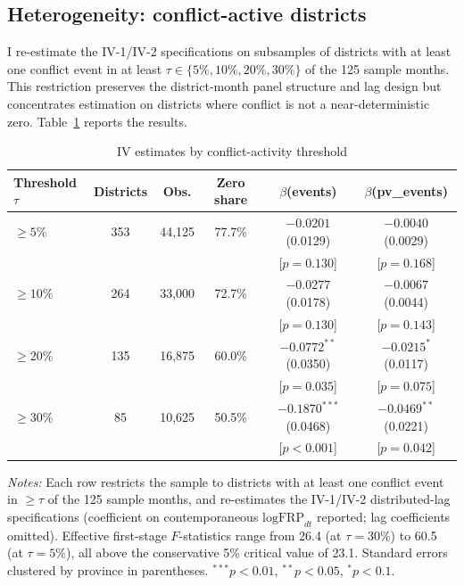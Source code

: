 \documentclass[12pt]{article}
\begin{document}
\subsection{Heterogeneity: conflict-active districts}
\label{sec:active}

I re-estimate the IV-1/IV-2 specifications on subsamples of districts with at least one conflict event in at least $\tau \in \{5\%, 10\%, 20\%, 30\%\}$ of the 125 sample months. This restriction preserves the district-month panel structure and lag design but concentrates estimation on districts where conflict is not a near-deterministic zero. Table~\ref{tab:active} reports the results.

\begin{table}[H]
\centering
\caption{IV estimates by conflict-activity threshold}
\label{tab:active}
\begin{tabular}{lccccc}
\toprule
Threshold $\tau$ & Districts & Obs. & Zero share & $\beta$(events) & $\beta$(pv\_events) \\
\midrule
$\geq 5\%$  & 353 & 44{,}125 & 77.7\% & $-0.0201$ (0.0129) & $-0.0040$ (0.0029) \\
            &     &          &        & [$p=0.130$] & [$p=0.168$] \\
$\geq 10\%$ & 264 & 33{,}000 & 72.7\% & $-0.0277$ (0.0178) & $-0.0067$ (0.0044) \\
            &     &          &        & [$p=0.130$] & [$p=0.143$] \\
$\geq 20\%$ & 135 & 16{,}875 & 60.0\% & $-0.0772^{**}$ (0.0350) & $-0.0215^{*}$ (0.0117) \\
            &     &          &        & [$p=0.035$] & [$p=0.075$] \\
$\geq 30\%$ & 85  & 10{,}625 & 50.5\% & $-0.1870^{***}$ (0.0468) & $-0.0469^{**}$ (0.0221) \\
            &     &          &        & [$p<0.001$] & [$p=0.042$] \\
\bottomrule
\end{tabular}
\begin{minipage}{0.95\textwidth}
\vspace{4pt}
\footnotesize \emph{Notes:} Each row restricts the sample to districts with at least one conflict event in $\geq \tau$ of the 125 sample months, and re-estimates the IV-1/IV-2 distributed-lag specifications (coefficient on contemporaneous $\text{logFRP}_{dt}$ reported; lag coefficients omitted). Effective first-stage $F$-statistics \citep{montielolea2013} range from 26.4 (at $\tau=30\%$) to 60.5 (at $\tau=5\%$), all above the conservative 5\% critical value of 23.1. Standard errors clustered by province in parentheses. $^{***}p<0.01$, $^{**}p<0.05$, $^{*}p<0.1$.
\end{minipage}
\end{table}
\end{document}
